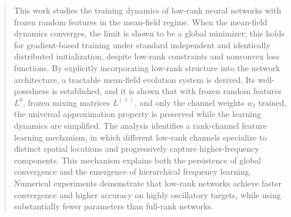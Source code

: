 \documentclass[nohyperref]{article}
\theoremstyle{plain}
\theoremstyle{definition}
\theoremstyle{remark}
\begin{document}
\printAffiliationsAndNotice{}



\begin{abstract}
This work studies the training dynamics of low-rank neural networks with frozen random features in the mean-field regime.
When the mean-field dynamics converges, the limit is shown to be a global minimizer; this holds for gradient-based training under standard independent and identically distributed initialization, despite low-rank constraints and nonconvex loss functions.
By explicitly incorporating low-rank structure into the network architecture, a tractable mean-field evolution system is derived. Its well-posedness is established, and it is shown that with frozen random features $L^0$, frozen mixing matrices $L^{(\ell)}$, and only the channel weights $w_\ell$ trained, the universal approximation property is preserved while the learning dynamics are simplified.
The analysis identifies a rank-channel feature learning mechanism, in which different low-rank channels specialize to distinct spatial locations and progressively capture higher-frequency components. This mechanism explains both the persistence of global convergence and the emergence of hierarchical frequency learning.
Numerical experiments demonstrate that low-rank networks achieve faster convergence and higher accuracy on highly oscillatory targets, while using substantially fewer parameters than full-rank networks.

\end{abstract}
\end{document}
